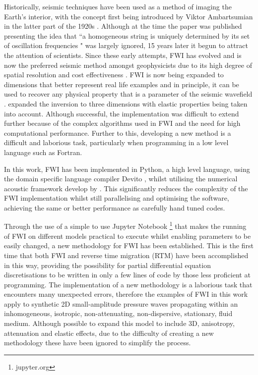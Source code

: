 Historically, seismic techniques have been used as a method of imaging the Earth's interior, with the concept first being introduced by Viktor Ambartsumian in the latter part of the 1920s \citep{guasch20123d}. Although at the time the paper was published presenting the idea that ``a homogeneous string is uniquely determined by its set of oscillation frequencies " \citep{ambartsumian1998life} was largely ignored, 15 years later it begun to attract the attention of scientists. Since these early attempts, FWI has evolved and is now the preferred seismic method amongst geophysicists due to its high degree of spatial resolution and cost effectiveness \citep{pratt1999seismic}. FWI is now being expanded to dimensions that better represent real life examples and in principle, it can be used to recover any physical property that is a parameter of the seismic wavefield \citep{warner2013anisotropic}. \citet{guasch20123d} expanded the inversion to three dimensions with elastic properties being taken into account. Although successful, the implementation was difficult to extend further because of the complex algorithms used in FWI and the need for high computational performance. Further to this, developing a new method is a difficult and laborious task, particularly when programming in a low level language such as Fortran. \par
In this work, FWI has been implemented in Python, a high level language, using the domain specific language compiler Devito \citep{lange2016devito} \citep{warner2013anisotropic}, whilst utilising the numerical acoustic framework develop by \citet{guasch20123d}. This significantly reduces the complexity of the FWI implementation whilst still parallelising and optimising the software, achieving the same or better performance as carefully hand tuned codes. \par
Through the use of a simple to use Jupyter Notebook \footnote{jupyter.org} that makes the running of FWI on different models practical to execute whilst enabling parameters to be easily changed, a new methodology for FWI has been established. This is the first time that both FWI and reverse time migration (RTM) have been accomplished in this way, providing the possibility for partial differential equation discretisations to be written in only a few lines of code by those less proficient at programming. The implementation of a new methodology is a laborious task that encounters many unexpected errors, therefore the examples of FWI in this work apply to synthetic 2D small-amplitude pressure waves propagating within an inhomogeneous, isotropic, non-attenuating, non-dispersive, stationary, fluid medium. Although possible to expand this model to include 3D, anisotropy, attenuation and elastic effects, due to the difficulty of creating a new methodology these have been ignored to simplify the process. \par

